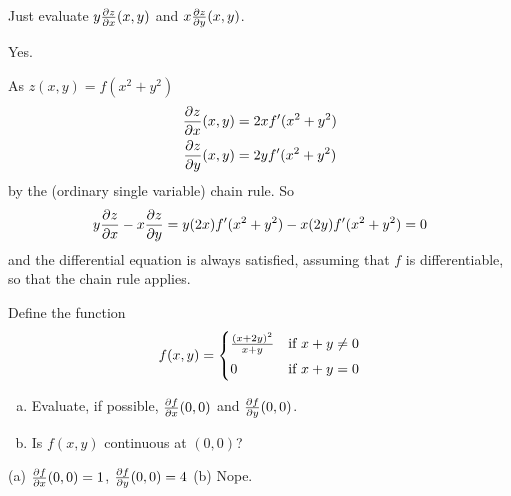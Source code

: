 \begin{hint}
Just evaluate $y\pdiff{z}{x}(x,y)$ and $x\pdiff{z}{y}(x,y)$.
\end{hint}

\begin{answer}
Yes.
\end{answer}

\begin{solution}
As $z(x,y)=f(x^2+y^2)$
\begin{align*}
\pdiff{z}{x}(x,y)&=2xf'(x^2+y^2) \\
\pdiff{z}{y}(x,y)&=2yf'(x^2+y^2)
\end{align*}
by the (ordinary single variable) chain rule.
So
\begin{equation*}
y\pdiff{z}{x}-x\pdiff{z}{y}
=y(2x)f'(x^2+y^2)-x(2y)f'(x^2+y^2)=0
\end{equation*}
and the differential equation is always satisfied, assuming that
$f$ is differentiable, so that the chain rule applies.
\end{solution}

\begin{question}
Define the function
\begin{equation*}
f(x,y)=\begin{cases}\frac{(x+2y)^2}{x+y}& \text{if $x+y\ne 0$} \\
                     \noalign{\vskip.05in}
                        0 &\text{if $x+y=0$}
       \end{cases}
\end{equation*}
\begin{enumerate}[(a)]
\item
Evaluate, if possible, $\pdiff{f}{x}(0,0)$ and 
$\pdiff{f}{y}(0,0)$.
\item
 Is $f(x,y)$ continuous at $(0,0)$? 
\end{enumerate}
\end{question}

%

\begin{answer}
(a) $\pdiff{f}{x}(0,0)=1$, $\pdiff{f}{y}(0,0)=4$\qquad
(b) Nope.
\end{answer}

